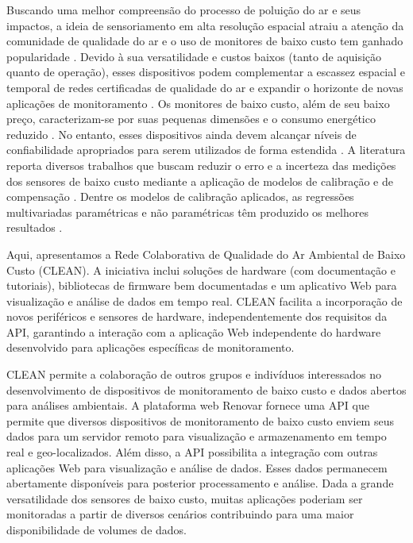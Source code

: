 Buscando uma melhor compreensão do processo de poluição do ar e seus impactos, a ideia de sensoriamento em alta resolução espacial atraiu a atenção da comunidade de qualidade do ar e o uso de monitores de baixo custo tem ganhado popularidade \cite{Motlagh2020TowardMonitoring,Kumar2015}. Devido à sua versatilidade e custos baixos (tanto de aquisição quanto de operação), esses dispositivos podem complementar a escassez espacial e temporal de redes certificadas de qualidade do ar e expandir o horizonte de novas aplicações de monitoramento \cite{Lewis2016EvaluatingResearch}. Os monitores de baixo custo, além de seu baixo preço, caracterizam-se por suas pequenas dimensões e o consumo energético reduzido \cite{Lewis2018Low-costApplications}. No entanto, esses dispositivos ainda devem alcançar níveis de confiabilidade apropriados para serem utilizados de forma estendida \cite{Penza2020Low-costMonitoring}. A literatura reporta diversos trabalhos que buscam reduzir o erro e a incerteza das medições dos sensores de baixo custo mediante a aplicação de modelos de calibração e de compensação \cite{Maag2018ADeployments, Concas2021LOW-COSTPREPRINT}. Dentre os modelos de calibração aplicados, as regressões multivariadas paramétricas e não paramétricas têm produzido os melhores resultados \cite{Feng2019ReviewTechnology,Concas2021LOW-COSTPREPRINT}.

Aqui, apresentamos a Rede Colaborativa de Qualidade do Ar Ambiental de Baixo Custo (CLEAN). A iniciativa inclui soluções de hardware (com documentação e tutoriais), bibliotecas de firmware bem documentadas e um aplicativo Web para visualização e análise de dados em tempo real. CLEAN facilita a incorporação de novos periféricos e sensores de hardware, independentemente dos requisitos da API, garantindo a interação com a aplicação Web independente do hardware desenvolvido para aplicações específicas de monitoramento.

CLEAN permite a colaboração de outros grupos e indivíduos interessados no desenvolvimento de dispositivos de monitoramento de baixo custo e dados abertos para análises ambientais. A plataforma web Renovar fornece uma API que permite que diversos dispositivos de monitoramento de baixo custo enviem seus dados para um servidor remoto para visualização e armazenamento em tempo real e geo-localizados. Além disso, a API possibilita a integração com outras aplicações Web para visualização e análise de dados. Esses dados permanecem abertamente disponíveis para posterior processamento e análise. Dada a grande versatilidade dos sensores de baixo custo, muitas aplicações poderiam ser monitoradas a partir de diversos cenários contribuindo para uma maior disponibilidade de volumes de dados.

